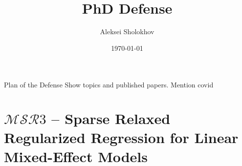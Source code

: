 \documentclass[8pt]{beamer}
\title{PhD Defense}
\date{\today}
\author{Aleksei Sholokhov}
\begin{document}
\maketitle

\begin{frame}{Plan of the Defense}
Show topics and published papers. Mention covid
\end{frame}

\section{$\mathcal{MSR}3$ -- Sparse Relaxed Regularized Regression for Linear Mixed-Effect Models}
\end{document}
